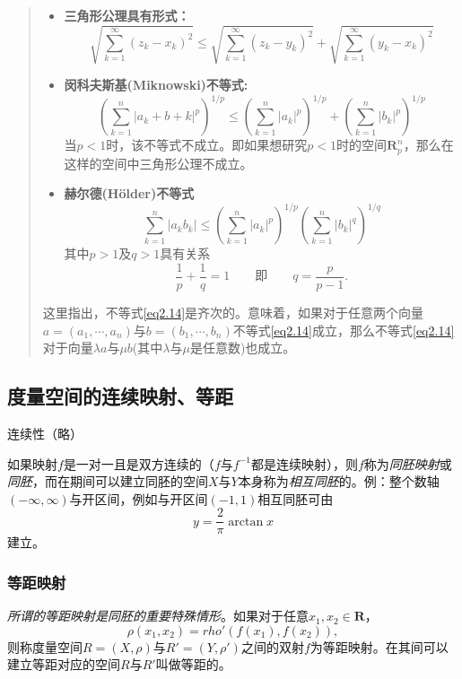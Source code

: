\begin{quote}
\begin{itemize}
	\item \textbf{三角形公理具有形式：}
	\begin{equation}
	\label{eq2.9}
	\sqrt{\sum\limits_{k=1}^{\infty}(z_k-x_k)^2} \leqslant \sqrt{\sum\limits_{k=1}^{\infty}(z_k-y_k)^2} + \sqrt{\sum\limits_{k=1}^{\infty}(y_k-x_k)^2}
	\end{equation}
	\item \textbf{闵科夫斯基(Miknowski)不等式:}
	\begin{equation}
	\label{eq2.13}
	\left(\sum\limits_{k=1}^{n}|a_k+b+k|^p\right)^{1/p} \leqslant \left(\sum\limits_{k=1}^{n}|a_k|^p\right)^{1/p} + \left(\sum\limits_{k=1}^{n}|b_k|^p\right)^{1/p}
	\end{equation}
	当$p<1$时，该不等式不成立。即如果想研究$p<1$时的空间$\mathbf{R}^n_p$，那么在这样的空间中三角形公理不成立。
	\item \textbf{赫尔德(H\"older)不等式}
	\begin{equation}
	\label{eq2.14}
	\sum\limits_{k=1}^{n}|a_k b_k| \leqslant \left(\sum\limits_{k=1}^{n}|a_k|^p\right)^{1/p} \left(\sum\limits_{k=1}^{n}|b_k|^q\right)^{1/q}
	\end{equation}
	其中$p>1$及$q>1$具有关系
	\begin{equation}
	\label{eq2.15}
	\dfrac{1}{p} + \dfrac{1}{q} = 1 \qquad \mbox{即} \qquad q = \dfrac{p}{p-1}.
	\end{equation}
\end{itemize}
	这里指出，不等式\cref{eq2.14}是齐次的。意味着，如果对于任意两个向量$a=(a_1,\cdots,a_n)$与$b=(b_1,\cdots,b_n)$不等式\cref{eq2.14}成立，那么不等式\cref{eq2.14}对于向量$\lambda a$与$\mu b$(其中$\lambda$与$\mu$是任意数)也成立。
\end{quote}
\subsection{度量空间的连续映射、等距}
连续性（略）

如果映射$f$是一对一且是双方连续的（$f$与$f^{-1}$都是连续映射），则$f$称为\textcolor[rgb]{1,0,0}{\emph{同胚映射}}或\textcolor[rgb]{1,0,0}{\emph{同胚}}，而在期间可以建立同胚的空间$X$与$Y$本身称为\textcolor[rgb]{1,0,0}{\emph{相互同胚}}的。例：整个数轴$(-\infty,\infty)$与开区间，例如与开区间$(-1,1)$相互同胚可由
\[
y=\dfrac{2}{\pi}\arctan x
\]
建立。

\subsubsection{等距映射}
\textcolor[rgb]{1,0,0}{\emph{所谓的等距映射是同胚的重要特殊情形}}。如果对于任意$x_1,x_2 \in \mathbf{R}$，
\[
\rho(x_1,x_2) = rho'(f(x_1),f(x_2)),
\]
则称度量空间$R=(X,\rho)$与$R'=(Y,\rho')$之间的双射$f$为\textcolor[rgb]{1,0,0}{等距映射}。在其间可以建立等距对应的空间$R$与$R'$叫做等距的。

